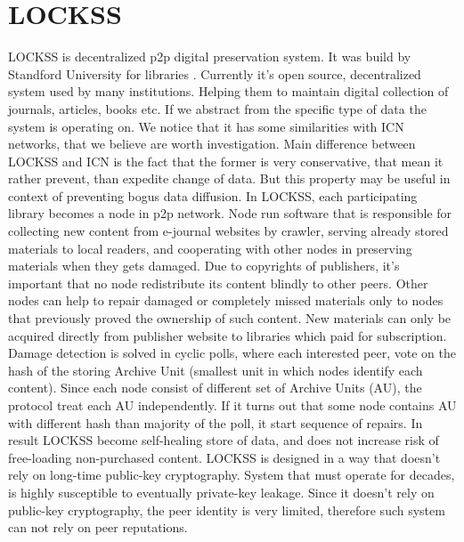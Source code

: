 \documentclass[nostrict]{szablonPG}
\begin{document}
\section{LOCKSS}
LOCKSS is decentralized p2p digital preservation system. It was build by Standford University for libraries \cite{maniatis2003preserving}. Currently it's open source, decentralized system used by many institutions. Helping them to maintain digital collection of journals, articles, books etc. If we abstract from the specific type of data the system is operating on. We notice that it has some similarities with ICN networks, that we believe are worth investigation. Main difference between LOCKSS and ICN is the fact that the former is very conservative, that mean it rather prevent, than expedite change of data. But this property may be useful in context of preventing bogus data diffusion. 
In LOCKSS, each participating library becomes a node in p2p network. Node run software that is responsible for collecting new content from e-journal websites by crawler, serving already stored materials to local readers, and cooperating with other nodes in preserving materials when they gets damaged. 
Due to copyrights of publishers, it's important that no node redistribute its content blindly to other peers. Other nodes can help to repair damaged or completely missed materials only to nodes that previously proved the ownership of such content. New materials can only be acquired directly from publisher website to libraries which paid for subscription. 
Damage detection is solved in cyclic polls, where each interested peer, vote on the hash of the storing Archive Unit (smallest unit in which nodes identify each content). Since each node consist of different set of Archive Units (AU), the protocol treat each AU independently. If it turns out that some node contains AU with different hash than majority of the poll, it start sequence of repairs. In result LOCKSS become self-healing store of data, and does not increase risk of free-loading non-purchased content.
LOCKSS is designed in a way that doesn't rely on long-time public-key cryptography. System that must operate for decades, is highly susceptible to eventually private-key leakage. Since it doesn't rely on public-key cryptography, the peer identity is very limited, therefore such system can not rely on peer reputations.
\end{document}
